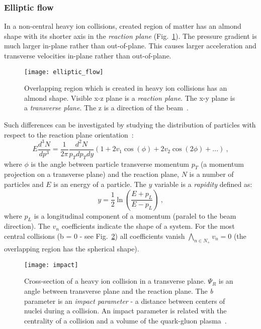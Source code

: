       \subsubsection{Elliptic flow}
        In a non-central heavy ion collisions, created region of matter has an almond shape with its shorter axis in the \textit{reaction plane} (Fig.~\ref{fig:elliptic_flow}).
        The pressure gradient is much larger in-plane rather than out-of-plane.
        This causes larger acceleration and transverse velocities in-plane rather than out-of-plane.
        \begin{figure}[h]
          \centering
          \texttt{[image: elliptic\_flow]}
          \caption{Overlapping region which is created in heavy ion collisions has an almond shape. Visible x-z plane is a \textit{reaction plane}. The x-y plane is a \textit{transverse plane}. The z is a direction of the beam~\cite{eflow}.}
          \label{fig:elliptic_flow}
        \end{figure}
        Such differences can be investigated by studying the distribution of particles with respect to the reaction plane orientation~\cite{hip}:
        \begin{equation}
          E\frac{d^3 N}{d p^3} = \frac{1}{2\pi} \frac{d^2 N}{p_T d p_T d y} (1 + 2 v_1 \cos(\phi) + 2 v_2 \cos(2 \phi) + ...)~,
          \label{eq:elliptic_flow}
        \end{equation}
        where $\phi$ is the angle between particle transverse momentum $p_T$ (a momentum projection on a transverse plane) and the reaction plane, $N$ is a number of particles and $E$ is an energy of a particle.
        The $y$ variable is a \textit{rapidity} defined as:
        \begin{equation}
          y = \frac{1}{2} \ln \left( \frac{E+ p_L}{E - p_L} \right)~,
        \end{equation}
        where $p_L$ is a longitudinal component of a momentum (paralel to the beam direction).
        The $v_n$ coefficients indicate the shape of a system.
        For the most central collisions (b = 0 - see Fig.~\ref{fig:impact_parameter}) all coefficients vanish $\bigwedge_{n \in N_{+}} v_n = 0$ (the overlapping region has the spherical shape).
        \begin{figure}[h]
          \centering
          \texttt{[image: impact]}
          \caption{Cross-section of a heavy ion collision in a transverse plane. $\Psi_R$ is an angle between transverse plane and the reaction plane. The \textit{b} parameter is an \textit{impact parameter} - a distance between centers of nuclei during a collision. An impact parameter is related with the centrality of a collision and a volume of the quark-gluon plasma~\cite{hip}.}
          \label{fig:impact_parameter}
        \end{figure}
